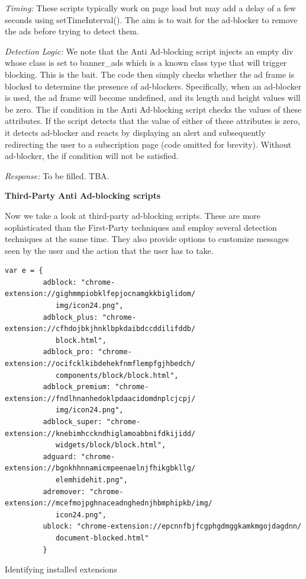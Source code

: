 \documentclass[runningheads,a4paper]{llncs}
\begin{document}
\textit{Timing:} These scripts typically work on page load but may add a delay of a few seconds using setTimeInterval(). The aim is to wait for the ad-blocker to remove the ads before trying to detect them.

\textit{Detection Logic:} We note that the Anti Ad-blocking script injects an empty div whose class is set to banner\_ads which is a known class type that will trigger blocking. This is the bait. The code then simply checks whether the ad frame is blocked to determine the presence of ad-blockers. Specifically, when an ad-blocker is used, the ad frame will become undefined, and its length and height values will be zero. The if condition in the Anti Ad-blocking script checks the values of these attributes. If the script detects that the value of either of these attributes is zero, it detects ad-blocker and reacts by displaying an alert and subsequently redirecting the user to a subscription page (code omitted for brevity). Without ad-blocker, the if condition will not be satisfied.

\textit{Response:} To be filled. TBA.


\textbf{Third-Party Anti Ad-blocking scripts}

Now we take a look at third-party ad-blocking scripts. These are more sophisticated than the First-Party techniques and employ several detection techniques at the same time. They also provide options to customize messages seen by the user and the action that the user has to take.

\begin{listing}[!h]
\begin{verbatim}
var e = {
         adblock: "chrome-extension://gighmmpiobklfepjocnamgkkbiglidom/
         	img/icon24.png",
         adblock_plus: "chrome-extension://cfhdojbkjhnklbpkdaibdccddilifddb/
         	block.html",
         adblock_pro: "chrome-extension://ocifcklkibdehekfnmflempfgjhbedch/
         	components/block/block.html",
         adblock_premium: "chrome-extension://fndlhnanhedoklpdaacidomdnplcjcpj/
         	img/icon24.png",
         adblock_super: "chrome-extension://knebimhcckndhiglamoabbnifdkijidd/
         	widgets/block/block.html",
         adguard: "chrome-extension://bgnkhhnnamicmpeenaelnjfhikgbkllg/
         	elemhidehit.png",
         adremover: "chrome-extension://mcefmojpghnaceadnghednjhbmphipkb/img/
         	icon24.png",
         ublock: "chrome-extension://epcnnfbjfcgphgdmggkamkmgojdagdnn/
         	document-blocked.html"
         }

\end{verbatim}
\caption{Identifying installed extensions}
\label{listing:extensions}
\end{listing}
            
\end{document}
